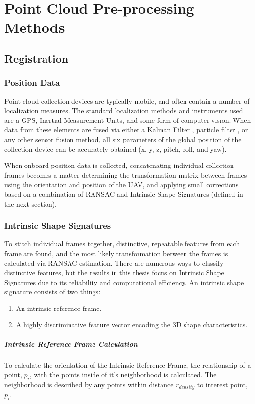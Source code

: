 \documentclass[12pt]{drexelthesis}
\let\Oldsection\section
\renewcommand{\section}{\FloatBarrier\Oldsection}
\let\Oldsubsection\subsection
\renewcommand{\subsection}{\FloatBarrier\Oldsubsection}
\let\Oldsubsubsection\subsubsection
\renewcommand{\subsubsection}{\FloatBarrier\Oldsubsubsection}
\begin{document}
\section{Point Cloud Pre-processing Methods}
\label{sec:preprocessing}
\subsection{Registration}
\subsubsection{Position Data}
Point cloud collection devices are typically mobile, and often contain a number of localization measures. The standard localization methods and instruments used are a GPS, Inertial Measurement Units, and some form of computer vision. When data from these elements are fused via either a Kalman Filter \cite{kalmanfilter}, particle filter \cite{particlefilter}, or any other sensor fusion method, all six parameters of the global position of the collection device can be accurately obtained (x, y, z, pitch, roll, and yaw).

When onboard position data is collected, concatenating individual collection frames becomes a matter determining the transformation matrix between frames using the orientation and position of the UAV, and applying small corrections based on a combination of RANSAC and Intrinsic Shape Signatures (defined in the next section).


\subsubsection{Intrinsic Shape Signatures}
To stitch individual frames together, distinctive, repeatable features from each frame are found, and the most likely transformation between the frames is calculated via RANSAC estimation. There are numerous ways to classify distinctive features, but the results in this thesis focus on Intrinsic Shape Signatures due to its reliability and computational efficiency.
An intrinsic shape signature consists of two things:

\begin{enumerate}
	\item An intrinsic reference frame.
	\item A highly discriminative feature vector encoding the 3D shape characteristics.
\end{enumerate}

\subparagraph{Intrinsic Reference Frame Calculation}
To calculate the orientation of the Intrinsic Reference Frame, the relationship of a point, $p_{i}$, with the points inside of it's neighborhood is calculated. The neighborhood is described by any points within distance $r_{density}$ to interest point, $p_{i}$.
\end{document}
